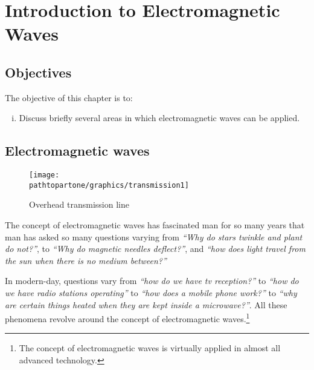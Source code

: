 \chapter{Introduction to Electromagnetic Waves}\label{lec:lec1}


\begin{mdframed}[backgroundcolor=lightblue, linewidth=1pt, hidealllines=true]
\section{Objectives}
The objective of this chapter is to:
\begin{enumerate}[(i)]
\item Discuss briefly several areas in which electromagnetic waves can be applied.
\end{enumerate}
\end{mdframed}

\section{Electromagnetic waves}

\begin{figure}[h]
\centering
\texttt{[image: \\pathtopartone/graphics/transmission1]}
\caption{Overhead transmission line}
\end{figure}

The concept of electromagnetic waves has fascinated man for so many years that man has asked so many questions varying from \emph{\textquotedblleft Why do stars twinkle and plant do not?\textquotedblright}, to \emph{\textquotedblleft Why do magnetic needles deflect?\textquotedblright}, and \emph{\textquotedblleft how does light travel from the sun when there is no medium between?\textquotedblright}

In modern-day, questions vary from \emph{\textquotedblleft how do we have tv reception?\textquotedblright} to \emph{\textquotedblleft how do we have radio stations operating\textquotedblright} to \emph{\textquotedblleft how does a mobile phone work?\textquotedblright} to \emph{\textquotedblleft why are certain things heated when they are kept inside a microwave?\textquotedblright}. All these phenomena revolve around the concept of electromagnetic waves.\footnote{The concept of electromagnetic waves is virtually applied in almost all advanced technology.}

